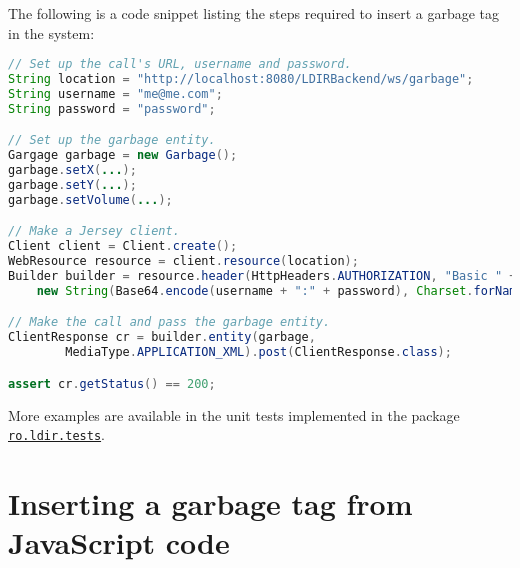 The following is a code snippet listing the steps required to insert a garbage
tag in the system:
\begin{lstlisting}[language=Java]
// Set up the call's URL, username and password.
String location = "http://localhost:8080/LDIRBackend/ws/garbage";
String username = "me@me.com";
String password = "password";

// Set up the garbage entity.
Gargage garbage = new Garbage();
garbage.setX(...);
garbage.setY(...);
garbage.setVolume(...);

// Make a Jersey client.
Client client = Client.create();
WebResource resource = client.resource(location);
Builder builder = resource.header(HttpHeaders.AUTHORIZATION, "Basic " +
    new String(Base64.encode(username + ":" + password), Charset.forName("ASCII")));

// Make the call and pass the garbage entity.
ClientResponse cr = builder.entity(garbage, 
        MediaType.APPLICATION_XML).post(ClientResponse.class); 

assert cr.getStatus() == 200;
\end{lstlisting}

More examples are available in the unit tests implemented in the package
\href{http://code.google.com/p/letsdoitromania2011/source/browse/#svn\%2Ftrunk\%2FWeb\%2FService\%2FLDIRBackendTests\%2Fsrc\%2Fro\%2Fldir\%2Ftests}{\texttt{ro.ldir.tests}}.

\section{Inserting a garbage tag from JavaScript code}

